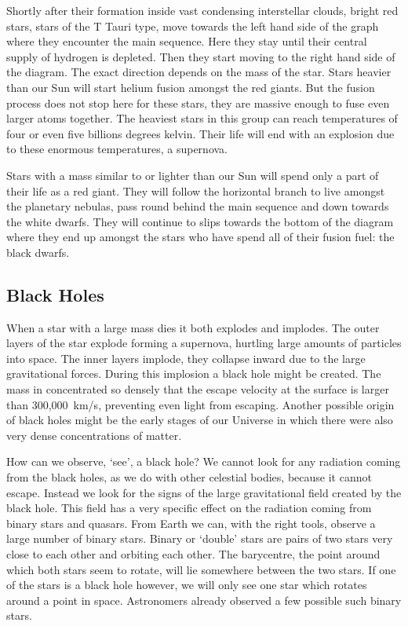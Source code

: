 \documentclass[12pt,a4paper]{article}
\numberwithin{equation}{section}
\numberwithin{figure}{section}
\numberwithin{table}{section}
\begin{document}
Shortly after their formation inside vast condensing interstellar clouds, bright red stars, stars of the T Tauri type, move towards the left hand side of the graph where they encounter the main sequence. Here they stay until their central supply of hydrogen is depleted. Then they start moving to the right hand side of the diagram. The exact direction depends on the mass of the star. Stars heavier than our Sun will start helium fusion amongst the red giants. But the fusion process does not stop here for these stars, they are massive enough to fuse even larger atoms together. The heaviest stars in this group can reach temperatures of four or even five billions degrees kelvin. Their life will end with an explosion due to these enormous temperatures, a supernova. 

Stars with a mass similar to or lighter than our Sun will spend only a part of their life as a red giant. They will follow the horizontal branch to live amongst the planetary nebulas, pass round behind the main sequence and down towards the white dwarfs. They will continue to slips towards the bottom of the diagram where they end up amongst the stars who have spend all of their fusion fuel: the black dwarfs.

\subsection{Black Holes}
When a star with a large mass dies it both explodes and implodes. The outer layers of the star explode forming a supernova, hurtling large amounts of particles into space. The inner layers implode, they collapse inward due to the large gravitational forces. During this implosion a black hole might be created. The mass in concentrated so densely that the escape velocity at the surface is larger than 300,000~km/s, preventing even light from escaping. Another possible origin of black holes might be the early stages of our Universe in which there were also very dense concentrations of matter.

How can we observe, `see', a black hole? We cannot look for any radiation coming from the black holes, as we do with other celestial bodies, because it cannot escape. Instead we look for the signs of the large gravitational field created by the black hole. This field has a very specific effect on the radiation coming from binary stars and quasars. From Earth we can, with the right tools, observe a large number of binary stars. Binary or `double' stars are pairs of two stars very close to each other and orbiting each other. The barycentre, the point around which both stars seem to rotate, will lie somewhere between the two stars. If one of the stars is a black hole however, we will only see one star which rotates around a point in space. Astronomers already observed a few possible such binary stars.
\end{document}
